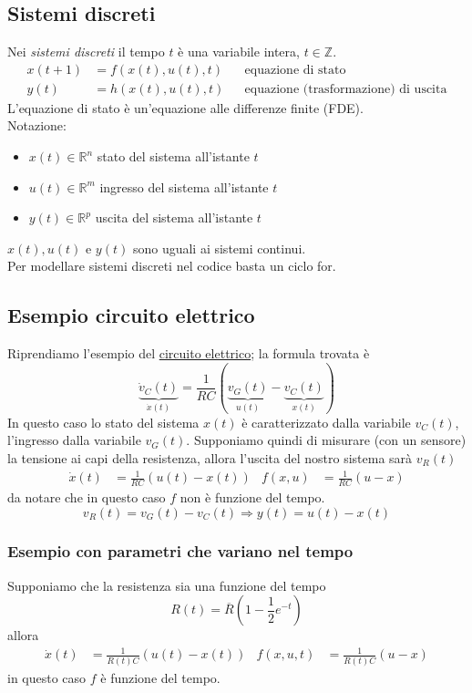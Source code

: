 \documentclass{article}
\begin{document}
\subsection{Sistemi discreti}
Nei \textit{sistemi discreti} il tempo $t$ è una variabile intera, $t \in \mathbb{Z}$.
\begin{align*}
    x(t+1) &= f \left(x(t), u(t), t\right) & &\text{equazione di stato}\\
    y(t) &= h\left(x(t), u(t), t\right) & &\text{equazione (trasformazione) di uscita}
\end{align*}
L'equazione di stato è un'equazione alle differenze finite (FDE).
\vspace*{0.2cm}\\
Notazione:
\begin{itemize}
    \item $x(t) \in \mathbb{R}^n$ stato  del sistema all'istante $t$
    \item $u(t) \in \mathbb{R}^m$ ingresso del sistema all'istante $t$
    \item $y(t) \in \mathbb{R}^p$ uscita del sistema all'istante $t$
\end{itemize}
$x(t),u(t) \text{ e } y(t)$ sono uguali ai sistemi continui.\\
Per modellare sistemi discreti nel codice basta un ciclo {\selectfont for}.



\subsection{Esempio circuito elettrico}
Riprendiamo l'esempio del \hyperlink{Circuito elettrico}{circuito elettrico}; la formula trovata è 
\[
    \underbrace{\dot v_C(t)}_{\dot x(t)} = \frac{1}{RC} (\underbrace{v_G (t)}_{u(t)} - \underbrace{v_C (t)}_{x(t)} )
\]
In questo caso lo stato del sistema $x(t)$ è caratterizzato dalla variabile $v_C(t)$, l'ingresso dalla variabile $v_G(t)$. Supponiamo quindi di misurare (con un sensore) la tensione ai capi della resistenza, allora l'uscita del nostro sistema sarà $v_R(t)$
\begin{align*}
    \dot x(t) &= \frac{1}{RC} \left(u(t)-x(t)\right) &
    f(x,u) &= \frac{1}{RC}(u-x)
\end{align*}
da notare che in questo caso $f$ non è funzione del tempo.
\[
    v_R(t) = v_G(t) - v_C(t) \Longrightarrow y(t) = u(t) - x(t)
\]


\subsubsection{Esempio con parametri che variano nel tempo}
Supponiamo che la resistenza sia una funzione del tempo
\[
    R(t) = \overline{R} \left(1- \frac{1}{2} e^{-t} \right)
\]
allora 
\begin{align*}
    \dot x(t) &= \frac{1}{R(t)C} \left(u(t)-x(t)\right) &
    f(x,u,t) &= \frac{1}{R(t)C}(u-x)
\end{align*}
in questo caso $f$ è funzione del tempo.
\end{document}
